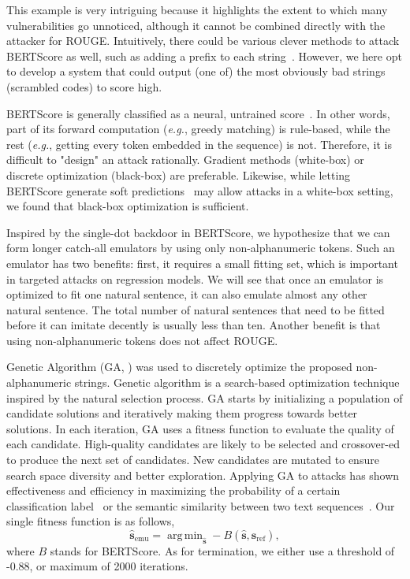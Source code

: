 \documentclass[11pt]{article}
\theoremstyle{remark}
\DeclareMathOperator*{\argmin}{arg\,min}
\begin{document}
This example is very intriguing because it highlights the extent to which many vulnerabilities go unnoticed, although it cannot be combined directly with the attacker for ROUGE. Intuitively, there could be various clever methods to attack BERTScore as well, such as adding a prefix to each string~\cite{wallace-etal-2019-universal,song-etal-2021-universal}. However, we here opt to develop a system that could output (one of) the most obviously bad strings (scrambled codes) to score high.

BERTScore is generally classified as a neural, untrained score~\cite{sai2022survey}. In other words, part of its forward computation (\emph{e.g.}, greedy matching) is rule-based, while the rest (\emph{e.g.}, getting every token embedded in the sequence) is not. Therefore, it is difficult to "design" an attack rationally. Gradient methods (white-box) or discrete optimization (black-box) are preferable. Likewise, while letting BERTScore generate soft predictions~\cite{jauregi-unanue-etal-2021-berttune} may allow attacks in a white-box setting, we found that black-box optimization is sufficient.

Inspired by the single-dot backdoor in BERTScore, we hypothesize that we can form longer catch-all emulators by using only non-alphanumeric tokens. Such an emulator has two benefits: first, it requires a small fitting set, which is important in targeted attacks on regression models. We will see that once an emulator is optimized to fit one natural sentence, it can also emulate almost any other natural sentence. The total number of natural sentences that need to be fitted before it can imitate decently is usually less than ten. Another benefit is that using non-alphanumeric tokens does not affect ROUGE.



Genetic Algorithm (GA, \citealp{holland1992genetic}) was used to discretely optimize the proposed non-alphanumeric strings. Genetic algorithm is a search-based optimization technique inspired by the natural selection process. GA starts by initializing a population of candidate solutions and iteratively making them progress towards better solutions. In each iteration, GA uses a fitness function to evaluate the quality of each candidate. High-quality candidates are likely to be selected and crossover-ed to produce the next set of candidates. New candidates are mutated to ensure search space diversity and better exploration. Applying GA to attacks has shown effectiveness and efficiency in maximizing the probability of a certain classification label~\cite{alzantot-etal-2018-generating} or the semantic similarity between two text sequences~\cite{maheshwary2021generating}. Our single fitness function is as follows,
\begin{equation}
    \mathbf{\hat{s}}_\text{emu} = \argmin_\mathbf{\hat{s}} -B(\hat{\mathbf{s}}, \mathbf{s}_\text{ref}),
\end{equation}
where $B$ stands for BERTScore. As for termination, we either use a threshold of -0.88, or maximum of 2000 iterations.
\end{document}

